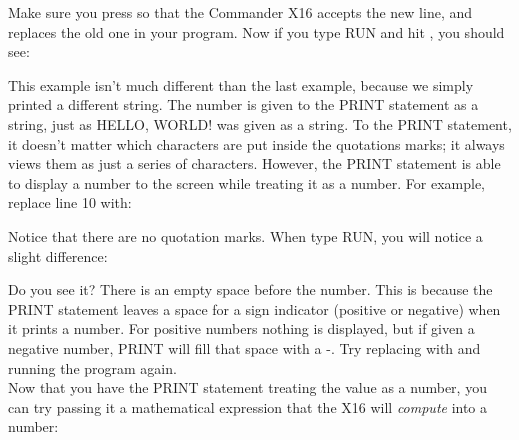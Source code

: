 
Make sure you press \returnkey so that the Commander X16 accepts the new line,
and replaces the old one in your program.  Now if you type {\ttfamily RUN} and
hit \returnkey, you should see:


This example isn't much different than the last example, because we simply
printed a different string.  The number {} is given to the
{\ttfamily PRINT} statement as a string, just as {\ttfamily HELLO, WORLD!} was
given as a string.  To the {\ttfamily PRINT} statement, it doesn't matter which
characters are put inside the quotations marks; it always views them as just a
series of characters.  However, the {\ttfamily PRINT} statement is able to
display a number to the screen while treating it as a number.  For example,
replace line 10 with:\\


Notice that there are no quotation marks.  When type {\ttfamily RUN}, you will
notice a slight difference:\\


Do you see it?  There is an empty space before the number.  This is because the
{\ttfamily PRINT} statement leaves a space for a sign indicator (positive or
negative) when it prints a number.  For positive numbers nothing is displayed,
but if given a negative number, {\ttfamily PRINT} will fill that space with a
{\ttfamily -}.  Try replacing {} with {} and running
the program again.\\

Now that you have the {\ttfamily PRINT} statement treating the value as a
number, you can try passing it a mathematical expression that the X16 will {\em
compute} into a number:\\


